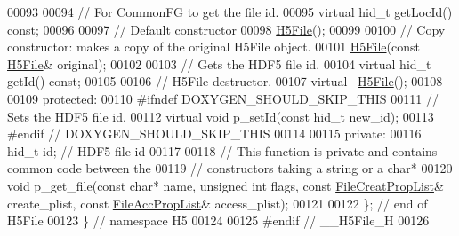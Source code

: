 \begin{DoxyCode}
00093 
00094         \textcolor{comment}{// For CommonFG to get the file id.}
00095         \textcolor{keyword}{virtual} hid\_t getLocId() \textcolor{keyword}{const};
00096 
00097         \textcolor{comment}{// Default constructor}
00098         \hyperlink{class_h5_1_1_h5_file}{H5File}();
00099 
00100         \textcolor{comment}{// Copy constructor: makes a copy of the original H5File object.}
00101         \hyperlink{class_h5_1_1_h5_file}{H5File}(\textcolor{keyword}{const} \hyperlink{class_h5_1_1_h5_file}{H5File}& original);
00102 
00103         \textcolor{comment}{// Gets the HDF5 file id.}
00104         \textcolor{keyword}{virtual} hid\_t getId() \textcolor{keyword}{const};
00105 
00106         \textcolor{comment}{// H5File destructor.}
00107         \textcolor{keyword}{virtual} ~\hyperlink{class_h5_1_1_h5_file}{H5File}();
00108 
00109    \textcolor{keyword}{protected}:
00110 \textcolor{preprocessor}{#ifndef DOXYGEN\_SHOULD\_SKIP\_THIS}
00111         \textcolor{comment}{// Sets the HDF5 file id.}
00112         \textcolor{keyword}{virtual} \textcolor{keywordtype}{void} p\_setId(\textcolor{keyword}{const} hid\_t new\_id);
00113 \textcolor{preprocessor}{#endif // DOXYGEN\_SHOULD\_SKIP\_THIS}
00114 
00115    \textcolor{keyword}{private}:
00116         hid\_t id;  \textcolor{comment}{// HDF5 file id}
00117 
00118         \textcolor{comment}{// This function is private and contains common code between the}
00119         \textcolor{comment}{// constructors taking a string or a char*}
00120         \textcolor{keywordtype}{void} p\_get\_file(\textcolor{keyword}{const} \textcolor{keywordtype}{char}* name, \textcolor{keywordtype}{unsigned} \textcolor{keywordtype}{int} flags, \textcolor{keyword}{const} 
      \hyperlink{class_h5_1_1_file_creat_prop_list}{FileCreatPropList}& create\_plist, \textcolor{keyword}{const} \hyperlink{class_h5_1_1_file_acc_prop_list}{FileAccPropList}& access\_plist);
00121 
00122 \}; \textcolor{comment}{// end of H5File}
00123 \} \textcolor{comment}{// namespace H5}
00124 
00125 \textcolor{preprocessor}{#endif // \_\_H5File\_H}
00126 
\end{DoxyCode}
